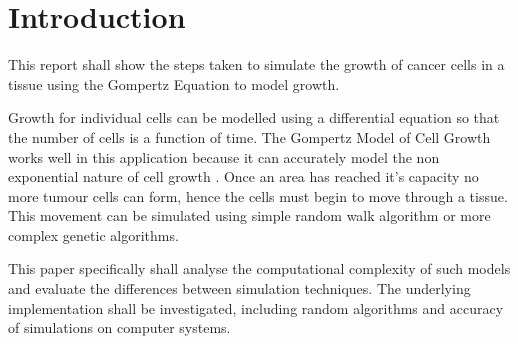 \chapter{Introduction}

This report shall show the steps taken to simulate the growth of cancer cells in a tissue using the Gompertz Equation to model growth.

Growth for individual cells can be modelled using a differential equation so that the number of cells is a function of time. The Gompertz Model of Cell Growth works well in this application because it can accurately model the non exponential nature of cell growth \autocite{tatroMathematicsCancerFitting}. Once an area has reached it's capacity no more tumour cells can form, hence the cells must begin to move through a tissue. This movement can be simulated using simple random walk algorithm or more complex genetic algorithms.

This paper specifically shall analyse the computational complexity of such models and evaluate the differences between simulation techniques. The underlying implementation shall be investigated, including random algorithms and accuracy of simulations on computer systems.